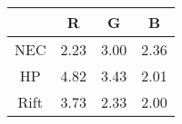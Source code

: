\begin{tabular}{cccc}
  \hline
   & R & G & B \\
  \hline
  NEC & 2.23 & 3.00 & 2.36 \\
  HP & 4.82 & 3.43 & 2.01 \\
  Rift & 3.73 & 2.33 & 2.00 \\
  \hline
\end{tabular}

